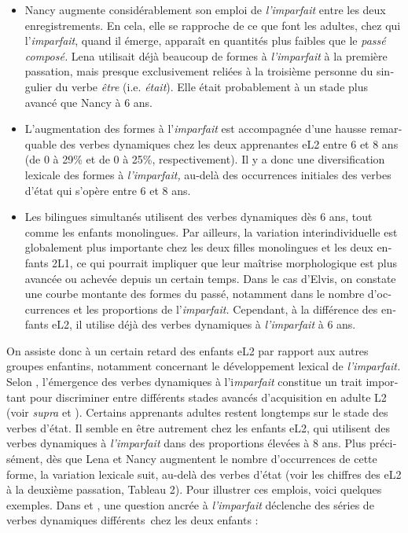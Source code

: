 \documentclass[french, output=paper]{langscibook}
\begin{document}
\begin{otherlanguage}{french}
\begin{itemize}
\item\sloppy
Nancy augmente considérablement son emploi de \textit{l’imparfait} entre les deux enregistrements. En cela, elle se rapproche de ce que font les adultes, chez qui l’\textit{imparfait}, quand il émerge, apparaît en quantités plus faibles que le \textit{passé composé.} Lena utilisait déjà beaucoup de formes à \textit{l’imparfait} à la première passation, mais presque exclusivement reliées à la troisième personne du singulier du verbe \textit{être} (i.e. \textit{était}). Elle était probablement à un stade plus avancé que Nancy à 6 ans.

\item 
L’augmentation des formes à l’\textit{imparfait} est accompagnée d’une hausse remarquable des verbes dynamiques chez les deux apprenantes eL2 entre 6 et 8 ans (de 0 à 29\% et de 0 à 25\%, respectivement). Il y a donc une diversification lexicale des formes à \textit{l’imparfait,} au-delà des occurrences initiales des verbes d’état qui s’opère entre 6 et 8 ans.

\item 
Les bilingues simultanés utilisent des verbes dynamiques dès 6 ans, tout comme les enfants monolingues. Par ailleurs, la variation interindividuelle est globalement plus importante chez les deux filles monolingues et les deux enfants 2L1, ce qui pourrait impliquer que leur maîtrise morphologique est plus avancée ou achevée depuis un certain temps. Dans le cas d’Elvis, on constate une courbe montante des formes du passé, notamment dans le nombre d’occurrences et les proportions de l’\textit{imparfait.} Cependant, à la différence des enfants eL2, il utilise déjà des verbes dynamiques à \textit{l’imparfait} à 6 ans.

\end{itemize}

\begin{sloppypar}
On assiste donc à un certain retard des enfants eL2 par rapport aux autres groupes enfantins, notamment concernant le développement lexical de \textit{l’imparfait.} Selon \citet{Kihlstedt2002}, l’émergence des verbes dynamiques à l’i\textit{mparfait} constitue un trait important pour discriminer entre différents stades avancés d’acquisition en adulte L2 (voir \textit{supra}  et ). Certains apprenants adultes restent longtemps sur le stade des verbes d’état. Il semble en être autrement chez les enfants eL2, qui utilisent des verbes dynamiques à \textit{l’imparfait} dans des proportions élevées à 8 ans. Plus précisément, dès que Lena et Nancy augmentent le nombre d’occurrences de cette forme, la variation lexicale suit, au-delà des verbes d’état (voir les chiffres des eL2 à la deuxième passation, Tableau 2). Pour illustrer ces emplois, voici quelques exemples. Dans  et , une question ancrée à \textit{l’imparfait} déclenche des séries de verbes dynamiques différents~chez les deux enfants :
\end{sloppypar}


\end{otherlanguage}
\end{document}
